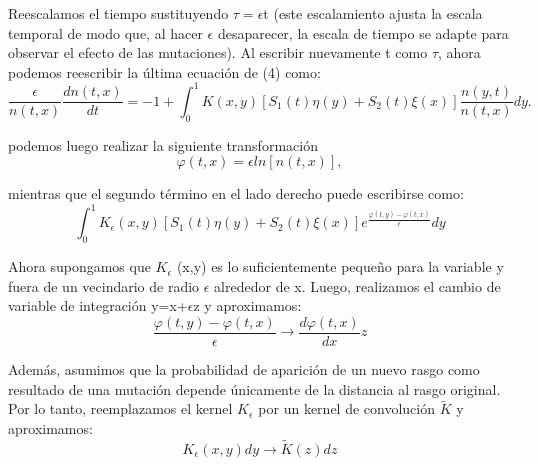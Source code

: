 \documentclass[letterpaper]{article}
\begin{document}
{        \normalsize{Reescalamos el tiempo sustituyendo $\tau=\epsilon$t (este escalamiento ajusta la escala temporal de modo que, al hacer $\epsilon$ desaparecer, la escala de tiempo se adapte para observar el efecto de las mutaciones). Al escribir nuevamente t como $\tau$, ahora podemos reescribir la última ecuación de (4) como:}\\

        \begin{equation}
            \frac{\epsilon}{n(t,x)}\frac{d n(t,x)}{dt}=-1+\int_{0}^{1}K(x,y)[S_1(t)\eta(y)+S_2(t)\xi(x)]\frac{n(y,t)}{n(t,x)}dy.
        \end{equation}

        \normalsize{podemos luego realizar la siguiente transformación}\\

        \begin{equation}
            \varphi(t,x)=\epsilon ln[n(t,x)],
        \end{equation}

        \normalsize{mientras que el segundo término en el lado derecho puede escribirse como:}\\

        \begin{equation}
            \int_{0}^{1}K_{\epsilon}(x,y)[S_1(t)\eta(y)+S_2(t)\xi(x)]e^{\frac{\varphi(t,y)-\varphi(t,x)}{\epsilon}}dy
        \end{equation}

        \normalsize{Ahora supongamos que $K_{\epsilon}$ (x,y) es lo suficientemente pequeño para la variable y fuera de un vecindario de radio $\epsilon$ alrededor de x. Luego, realizamos el cambio de variable de integración y=x+$\epsilon$z y aproximamos:}\\

        \begin{equation}
            \frac{\varphi(t,y)-\varphi(t,x)}{\epsilon} \to \frac{d\varphi(t,x) }{dx}z
        \end{equation}

        \normalsize{Además, asumimos que la probabilidad de aparición de un nuevo rasgo como resultado de una mutación depende únicamente de la distancia al rasgo original. Por lo tanto, reemplazamos el kernel $K_{\epsilon}$ por un kernel de convolución $\widetilde{K}$ y aproximamos:}\\

        \begin{equation}
            K_{\epsilon}(x,y)dy\longrightarrow \widetilde{K}(z)dz
        \end{equation}

}
\end{document}
